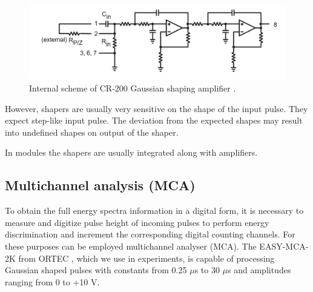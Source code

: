 \begin{figure}[H]
 \centering
 \includegraphics[scale=0.35, angle = 0]{./pictures/CRshaper.png}
 \caption{Internal scheme of CR-200 Gaussian shaping amplifier \cite{cr200}.}
 \label{internal2}
 
\end{figure}

However, shapers are usually very sensitive on the shape of the input pulse. They expect step-like input pulse. The deviation from the expected shapes may result into undefined shapes on output of the shaper.
\par
In modules the shapers are usually integrated along with amplifiers.

\subsection{Multichannel analysis (MCA)}
To obtain the full energy spectra information in a digital form, it is necessary to measure and digitize pulse height of incoming pulses to perform energy discrimination and increment the corresponding digital counting channels. For these purposes can be employed multichannel analyser (MCA). The EASY-MCA-2K from ORTEC \cite{MCAOrtec}, which we use in experiments, is capable of processing Gaussian shaped pulses with constants from 0.25 $\mu$s to 30 $\mu$s and amplitudes ranging from 0 to +10 V.




